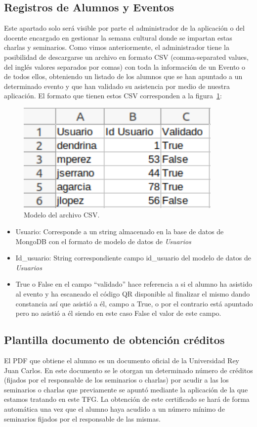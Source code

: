 \documentclass[a4paper, 12pt]{book}
\begin{document}
\subsection{Registros de Alumnos y Eventos}
	Este apartado solo será visible por parte el administrador de la aplicación o del docente encargado en gestionar la semana cultural donde se impartan estas charlas y seminarios. Como vimos anteriormente, el administrador tiene la posibilidad de descargarse un archivo en formato CSV (comma-separated values, del inglés valores separados por comas) con toda la información de un Evento o de todos ellos, obteniendo un listado de los alumnos que se han apuntado a un determinado evento y que han validado su asistencia por medio de nuestra aplicación.
	El formato que tienen estos CSV corresponden a la figura~\ref{fig:CSVAlumnos}:
	\begin{figure}[h!]
  	\centering
  	\includegraphics[width=10cm, keepaspectratio]{img/CSVAlumnos.png}
  	\caption{Modelo del archivo CSV.}\label{fig:CSVAlumnos}
	\end{figure}
	\begin{itemize}
		\item Usuario: Corresponde a un string almacenado en la base de datos de MongoDB con el formato de modelo de datos de \textit{Usuarios}
		\item Id\_usuario: String correspondiente campo id\_usuario del modelo de datos de \textit{Usuarios}
		\item True o False en el campo ``validado'' hace referencia a si el alumno ha asistido al evento y ha escaneado el código QR disponible al finalizar el mismo dando constancia así que asistió a él, campo a True, o por el contrario está apuntado pero no asistió a él siendo en este caso False el valor de este campo.
	\end{itemize}
	

\subsection{Plantilla documento de obtención créditos}
	El PDF que obtiene el alumno es un documento oficial de la Universidad Rey Juan Carlos. En este documento se le otorgan un determinado número de créditos (fijados por el responsable de los seminarios o charlas) por acudir a las los seminarios o charlas que previamente se apuntó mediante la aplicación de la que estamos tratando en este TFG. La obtención de este certificado se hará de forma automática una vez que el alumno haya acudido a un número mínimo de seminarios fijados por el responsable de las mismas. 
\end{document}
